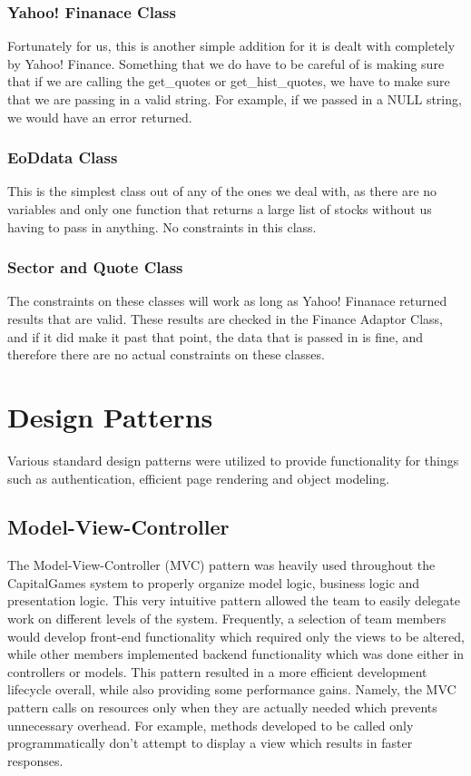 \subsubsection{Yahoo! Finanace Class}
Fortunately for us, this is another simple addition for it is dealt with completely by Yahoo! Finance. Something that we do have to be careful of is making sure that if we are calling the get\_quotes or get\_hist\_quotes, we have to make sure that we are passing in a valid string. For example, if we passed in a NULL string, we would have an error returned.
\subsubsection{EoDdata Class}
This is the simplest class out of any of the ones we deal with, as there are no variables and only one function that returns a large list of stocks without us having to pass in anything. No constraints in this class.
\subsubsection{Sector and Quote Class}
The constraints on these classes will work as long as Yahoo! Finanace returned results that are valid. These results are checked in the Finance Adaptor Class, and if it did make it past that point, the data that is passed in is fine, and therefore there are no actual constraints on these classes.


\section{Design Patterns}
Various standard design patterns were utilized to provide functionality for things such as authentication, efficient page rendering and object modeling.
\subsection{Model-View-Controller}
The Model-View-Controller (MVC) pattern was heavily used throughout the CapitalGames system to properly organize model logic, business logic and presentation logic. This very intuitive pattern allowed the team to easily delegate work on different levels of the system. Frequently, a selection of team members would develop front-end functionality which required only the views to be altered, while other members implemented backend functionality which was done either in controllers or models. This pattern resulted in a more efficient development lifecycle overall, while also providing some performance gains. Namely, the MVC pattern calls on resources only when they are actually needed which prevents unnecessary overhead. For example, methods developed to be called only programmatically don't attempt to display a view which results in faster responses.
